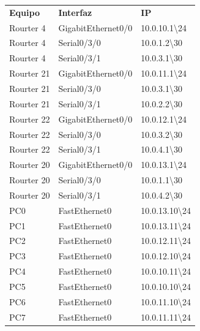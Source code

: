 \documentclass[spanish]{udpreport}
\begin{document}
\begin{table}[H]
\centering
\begin{tabular}{p{3cm}|p{4cm}|p{4cm}}
\textbf{Equipo} & \textbf{Interfaz} & \textbf{IP} \\
       Rourter 4 & GigabitEthernet0/0 & 10.0.10.1\textbackslash 24 \\
       Rourter 4 & Serial0/3/0 & 10.0.1.2\textbackslash 30 \\
       Rourter 4 & Serial0/3/1 & 10.0.3.1\textbackslash 30 \\
       Rourter 21 & GigabitEthernet0/0 & 10.0.11.1\textbackslash 24 \\
       Rourter 21 & Serial0/3/0 & 10.0.3.1\textbackslash 30 \\
       Rourter 21 & Serial0/3/1 & 10.0.2.2\textbackslash 30 \\
       Rourter 22 & GigabitEthernet0/0 & 10.0.12.1\textbackslash 24 \\
       Rourter 22 & Serial0/3/0 & 10.0.3.2\textbackslash 30 \\
       Rourter 22 & Serial0/3/1 & 10.0.4.1\textbackslash 30 \\
       Rourter 20 & GigabitEthernet0/0 & 10.0.13.1\textbackslash 24 \\
       Rourter 20 & Serial0/3/0 & 10.0.1.1\textbackslash 30 \\
       Rourter 20 & Serial0/3/1 & 10.0.4.2\textbackslash 30 \\
       PC0 & FastEthernet0 & 10.0.13.10\textbackslash 24 \\
       PC1 & FastEthernet0 & 10.0.13.11\textbackslash 24 \\
       PC2 & FastEthernet0 & 10.0.12.11\textbackslash 24 \\
       PC3 & FastEthernet0 & 10.0.12.10\textbackslash 24 \\
       PC4 & FastEthernet0 & 10.0.10.11\textbackslash 24 \\
       PC5 & FastEthernet0 & 10.0.10.10\textbackslash 24 \\
       PC6 & FastEthernet0 & 10.0.11.10\textbackslash 24 \\
       PC7 & FastEthernet0 & 10.0.11.11\textbackslash 24 \\
\end{tabular}
\end{table}
\end{document}
